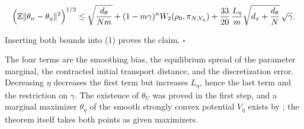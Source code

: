 \documentclass[11pt,a4paper]{report}
\begin{document}
\[\Bigl(\mathbb E\|\theta_n-\theta_\eta\|^2\Bigr)^{1/2}\le\sqrt{\frac{d_\theta}{Nm}}+(1-m\gamma)^nW_2(\rho_0,\pi_{N,V_\eta})+\frac{33}{20}\,\frac{L_\eta}{m}\sqrt{d_x+\frac{d_\theta}N}\,\sqrt\gamma .\]


Inserting both bounds into (1) proves the claim. \(\square\)




The four terms are the smoothing bias, the equilibrium spread of the parameter marginal, the contracted initial transport distance, and the discretization error. Decreasing \(\eta\) decreases the first term but increases \(L_\eta\), hence the last term and the restriction on \(\gamma\). The existence of \(\theta_U\) was proved in the first step, and a marginal maximizer \(\theta_\eta\) of the smooth strongly convex potential \(V_\eta\) exists by \cite[Section~3.9.4]{LangevinLean2026IPLA}; the theorem itself takes both points as given maximizers.
\end{document}
